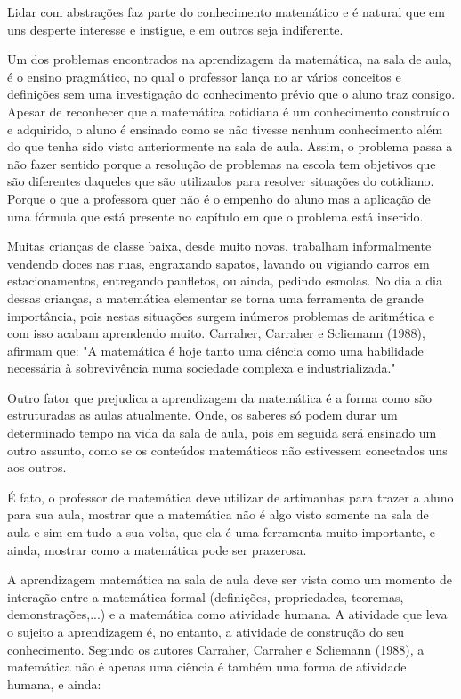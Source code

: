 \documentclass[brasil]{abnt}
\begin{document}
    Lidar com abstrações faz parte do conhecimento matemático e é natural que em uns desperte interesse e instigue, e em outros seja indiferente. 
    
    Um dos problemas encontrados na aprendizagem da matemática, na sala de aula, é o ensino pragmático, no qual o professor lança no ar vários conceitos e definições sem uma investigação 
    do conhecimento prévio que o aluno traz consigo. Apesar de reconhecer que a matemática cotidiana é um conhecimento construído e adquirido, o aluno é ensinado como se não tivesse nenhum conhecimento 
    além do que tenha sido visto anteriormente na sala de aula. Assim, o problema passa a não fazer sentido porque a resolução de problemas na escola tem objetivos que são diferentes daqueles que são 
    utilizados para resolver situações do cotidiano. Porque o que a professora quer não é o empenho do aluno mas a aplicação de uma fórmula que está presente no capítulo em que o problema está inserido.
    
    Muitas crianças de classe baixa, desde muito novas, trabalham informalmente vendendo doces nas ruas, engraxando sapatos, lavando ou vigiando carros em estacionamentos, entregando 
    panfletos, ou ainda, pedindo esmolas. No dia a dia dessas crianças, a matemática elementar se torna uma ferramenta de grande importância, pois nestas situações surgem inúmeros problemas de aritmética  
    e com isso acabam aprendendo muito. Carraher, Carraher e Scliemann (1988), afirmam que: "A matemática é hoje tanto uma ciência como uma habilidade necessária à sobrevivência numa sociedade 
    complexa e industrializada."
    
    Outro fator que prejudica a aprendizagem da matemática é a forma como são estruturadas as aulas atualmente. Onde, os saberes só podem durar um determinado tempo na vida da sala de aula, pois em seguida 
    será ensinado um outro assunto, como se os conteúdos matemáticos não estivessem conectados uns aos outros.
   
    É fato, o professor de matemática deve utilizar de artimanhas para trazer a aluno para sua aula, mostrar que a matemática não é algo visto somente na sala de aula e sim em tudo a sua volta, que ela é uma 
    ferramenta muito importante, e ainda, mostrar como a matemática pode ser prazerosa.
       
    A aprendizagem matemática na sala de aula deve ser vista como um momento de interação entre a matemática formal (definições, propriedades, teoremas, demonstrações,...) e a matemática como atividade humana. 
    A atividade que leva o sujeito a aprendizagem é, no entanto, a atividade de construção do seu conhecimento. Segundo os autores Carraher, Carraher e Scliemann (1988), a matemática não é apenas uma ciência é 
    também uma forma de atividade humana, e ainda: 
    
\end{document}
